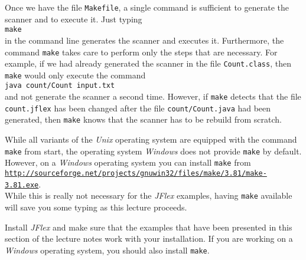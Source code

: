 Once we have the file \texttt{Makefile}, a single command is sufficient to generate the scanner and
to execute it.  Just typing
\\[0.2cm]
\hspace*{1.3cm}
\texttt{make}
\\[0.2cm] 
in the command line generates the scanner and executes it.  Furthermore, the command \texttt{make}
takes care to perform only the steps that are necessary.  For example, if we had already generated
the scanner in the file \texttt{Count.class}, then \texttt{make} would only execute the command
\\
\hspace*{1.3cm}
\texttt{java count/Count input.txt}
\\[0.2cm]
and not generate the scanner a second time.  However, if \texttt{make} detects that the file
\texttt{count.jflex} has been changed after the file \texttt{count/Count.java} had been generated,
then \texttt{make} knows that the scanner has to be rebuild from scratch.

\remarkEng
While all variants of the \textsl{Unix} operating system are equipped with the command \texttt{make}
from start, the operating system \textsl{Windows} does not provide \texttt{make} by default.
However, on a \textsl{Windows} operating system you can install \texttt{make} from
\\[0.2cm]
\hspace*{1.3cm}
\href{http://sourceforge.net/projects/gnuwin32/files/make/3.81/make-3.81.exe}{\texttt{http://sourceforge.net/projects/gnuwin32/files/make/3.81/make-3.81.exe}}.
\\[0.2cm]
While this is really not necessary for the \textsl{JFlex} examples, having \texttt{make} available
will save you some typing as this lecture proceeds.

\homeworkEng
Install \textsl{JFlex} and make sure that the examples that have been presented in this section of
the lecture notes work with your installation.  If you are working on a \textsl{Windows} operating
system, you should also install \texttt{make}. 

